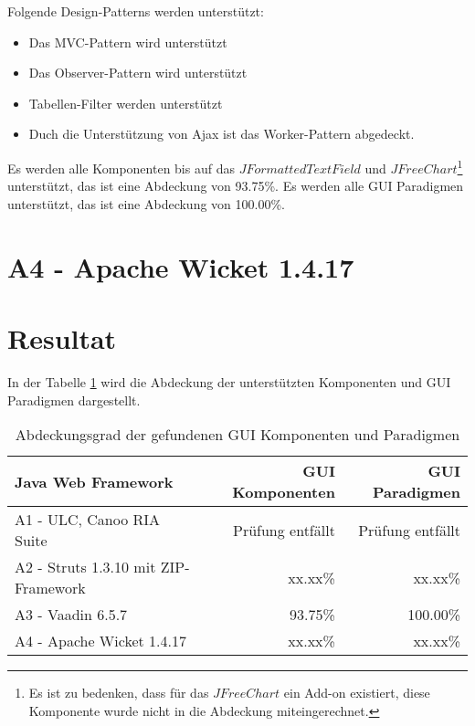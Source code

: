 \noindent
Folgende Design-Patterns werden unterstützt:

\begin{itemize}
  \item Das MVC-Pattern wird unterstützt
  \item Das Observer-Pattern wird unterstützt
  \item Tabellen-Filter werden unterstützt
  \item Duch die Unterstützung von Ajax ist das Worker-Pattern abgedeckt.
\end{itemize}

\noindent
Es werden alle Komponenten bis auf das \(JFormattedTextField\) und
\(JFreeChart\)\footnote{Es ist zu bedenken, dass für das \(JFreeChart\) ein
Add-on existiert, diese Komponente wurde nicht in die Abdeckung
miteingerechnet.} unterstützt, das ist eine Abdeckung von 93.75\%. Es werden
alle GUI Paradigmen unterstützt, das ist eine Abdeckung von 100.00\%.

\section{A4 - Apache Wicket 1.4.17}

\section{Resultat}

In der Tabelle \ref{tab:unterstuetztungDerKomponenten} wird die Abdeckung der
unterstützten Komponenten und GUI Paradigmen dargestellt.
\newline

\begin{table}[!h]
  \sffamily 
  \begin{center}
    \begin{tabular}{lrr}
      \toprule
      Java Web Framework & GUI Komponenten & GUI Paradigmen\\
      \midrule
      A1 - ULC, Canoo RIA Suite & Prüfung entfällt & Prüfung entfällt\\
      A2 - Struts 1.3.10 mit ZIP-Framework & xx.xx\% & xx.xx\%\\
      A3 - Vaadin 6.5.7 & 93.75\% & 100.00\%\\
      A4 - Apache Wicket 1.4.17 & xx.xx\% & xx.xx\%\\
      \bottomrule
    \end{tabular}
    \caption{Abdeckungsgrad der gefundenen GUI Komponenten und Paradigmen}
    \label{tab:unterstuetztungDerKomponenten}
  \end{center}
\end{table}
